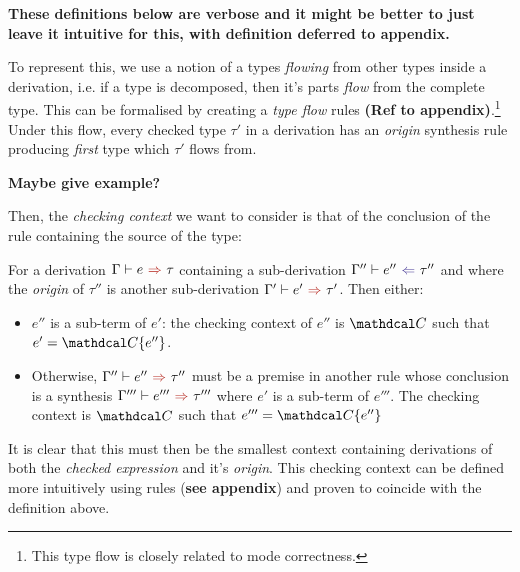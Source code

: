 \textbf{These definitions below are verbose and it might be better to just leave it intuitive for this, with definition deferred to appendix.}

To represent this, we use a notion of a types \textit{flowing} from other types inside a derivation, i.e. if a type is decomposed, then it's parts \textit{flow} from the complete type. This can be formalised by creating a \textit{type flow} rules \textbf{(Ref to appendix)}.\footnote{This type flow is closely related to mode correctness.} Under this flow, every checked type $\tau'$ in a derivation has an \textit{origin} synthesis rule producing \textit{first} type which $\tau'$ flows from.

\textbf{Maybe give example?}

Then, the \textit{checking context} we want to consider is that of the conclusion of the rule containing the source of the type:
\begin{definition}
\label{def:CheckingContext}
For a derivation $\synthesis{e}{\tau}$ containing a sub-derivation $\analysis[\Gamma'']{e''}{\tau''}$ and where the \textit{origin} of $\tau''$ is another sub-derivation $\synthesis[\Gamma']{e'}{\tau'}$. Then either:
\begin{itemize}
\item $e''$ is a sub-term of $e'$: the checking context of $e''$ is $\C$ such that $e' = \C\{e''\}$.
\item Otherwise, $\synthesis[\Gamma'']{e''}{\tau''}$ must be a premise in another rule whose conclusion is a synthesis $\synthesis[\Gamma''']{e'''}{\tau'''}$ where $e'$ is a sub-term of $e'''$. The checking context is $\C$ such that $e''' = \C\{e''\}$
\end{itemize}
\end{definition}
It is clear that this must then be the smallest context containing derivations of both the \textit{checked expression} and it's \textit{origin}. This checking context can be defined more intuitively using rules (\textbf{see appendix}) and proven to coincide with the definition above.

